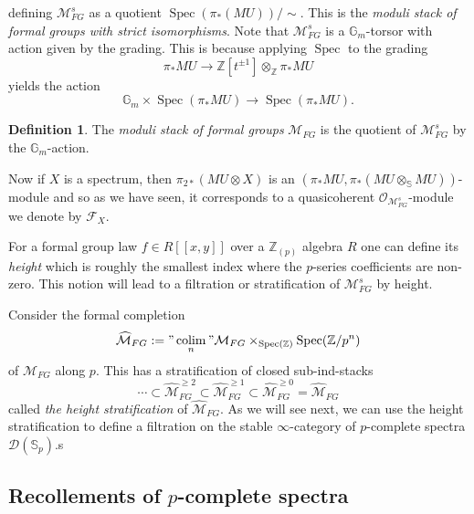 \documentclass[a4paper]{article} %
\theoremstyle{definition}
\newtheorem{definition}[theorem]{Definition}
\newcommand{\Z}{\mathbb{Z}}
\newcommand{\Sph}{\mathbb{S}}
\DeclareMathOperator{\Spec}{Spec}       %
\DeclareMathOperator{\colim}{colim}     %
\newcommand{\moduliS}{\mathcal{M}_{FG}^s}
\newcommand{\moduli}{\mathcal{M}_{FG}}
\newcommand{\moduliH}{\widehat{\mathcal{M}}_{FG}}
\newcommand{\Spp}{\mathcal{D}(\mathbb{S}_p)}
\begin{document}
\begin{center}
\end{center}
defining $\moduliS$ as a quotient $\Spec(\pi_{*}(MU))/\sim $. This is the \textit{moduli stack of formal groups with strict isomorphisms}. Note that $\moduliS$ is a $\mathbb{G}_m$-torsor with action given by the grading. This is because applying $\Spec$ to the grading
\[
\pi_* MU \to \Z [ t^{\pm 1} ] \otimes_\Z \pi_* MU
\]
yields the action
\[
\mathbb{G}_m \times \Spec (\pi_* MU) \to \Spec (\pi_* MU).
\]

\begin{definition}
  The \textit{moduli stack of formal groups} $\moduli$ is the quotient of $\moduliS$ by the $\mathbb{G}_m$-action.
\end{definition}

Now if $X$ is a spectrum, then $\pi_{2*}(MU \otimes X)$ is an $(\pi_* MU, \pi_*(MU \otimes_\Sph MU))$-module and so as we have seen, it corresponds to a quasicoherent $\mathcal{O}_{\moduliS}$-module we denote by $\mathcal{F}_X$. 

For a formal group law $f\in R[[x,y]]$ over a $\Z_{(p)}$ algebra $R$ one can define its \emph{height} which is roughly the smallest index where the $p$-series coefficients are non-zero. This notion will lead to a filtration or stratification of $\mathcal{M}^s_{FG}$ by height.

Consider the formal completion
\[
\moduliH := "\colim_n" \moduli \times_{\Spec (\Z)} \Spec(\Z /p^n)
\]
of $\moduli$ along $p$. This has a stratification of closed sub-ind-stacks
\[
\cdots \subset \moduliH^{\ge 2} \subset \moduliH^{\ge 1}  \subset \moduliH^{\ge 0} = \moduliH
\]
called \textit{the height stratification} of $\moduliH$. As we will see next, we can use the height stratification to define a filtration on the stable $\infty$-category of $p$-complete spectra $\Spp$.s

\subsection{Recollements of $p$-complete spectra}\label{Subsection:recollementpcompletespectra}
\end{document}
